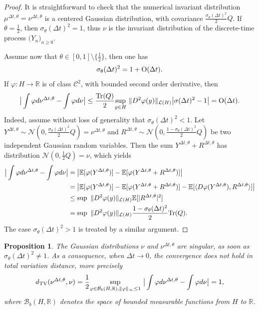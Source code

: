 \documentclass[11pt]{amsart}
\newcommand{\E}{\mathbb{E}}
\newcommand{\R}{\mathbb{R}}
\newtheorem{propo}[theo]{Proposition}
\begin{document}
\begin{proof}
 It is straightforward to check that the numerical invariant distribution $\mu^{\Delta t,\theta}=\nu^{\Delta t,\theta}$ is a centered Gaussian distribution, with covariance $\frac{\sigma_\theta(\Delta t)^2}{2}Q$.
If $\theta=\frac12$, then $\sigma_\theta(\Delta t)^2=1$, thus $\nu$ is the invariant distribution of the discrete-time process $\bigl(Y_n\bigr)_{n\ge 0}$.


Assume now that $\theta\in[0,1]\setminus\{\frac12\}$, then one has
\[
\sigma_\theta(\Delta t)^2=1+{\rm O}(\Delta t).
\]
If $\varphi:H\to\R$ is of class $\mathcal{C}^2$, with bounded second order derivative, then
\begin{equation}\label{eq:error_Gaussian_C2}
\big|\int \varphi d\nu^{\Delta t,\theta}-\int\varphi d\nu\big|\le \frac{{\rm Tr}(Q)}{2} \underset{y\in H}\sup~\|D^2\varphi(y)\|_{\mathcal{L}(H)}\big|\sigma(\Delta t)^2-1\big|={\rm O}(\Delta t).
\end{equation}
Indeed, assume without loss of generality that $\sigma_\theta(\Delta t)^2<1$. Let $Y^{\Delta t,\theta}\sim \mathcal{N}(0,\frac{\sigma_\theta(\Delta t)^2}{2}Q)=\nu^{\Delta t,\theta}$ and $R^{\Delta t,\theta}\sim \mathcal{N}(0,\frac{1-\sigma_\theta(\Delta t)^2}{2}Q)$ be two independent Gaussian random variables. Then the sum $Y^{\Delta t,\theta}+R^{\Delta t,\theta}$ has distribution $\mathcal{N}(0,\frac12 Q)=\nu$, which yields
\begin{align*}
\big|\int \varphi d\nu^{\Delta t,\theta}-\int\varphi d\nu\big|&=\big|\E[\varphi(Y^{\Delta t,\theta})]-\E[\varphi(Y^{\Delta t,\theta}+R^{\Delta t,\theta})]\big|\\
&=\big|\E[\varphi(Y^{\Delta t,\theta})]-\E[\varphi(Y^{\Delta t,\theta}+R^{\Delta t,\theta})]-\E[\langle D\varphi(Y^{\Delta t,\theta}),R^{\Delta t,\theta}\rangle]\big|\\
&\le \sup~\|D^2\varphi(y)\|_{\mathcal{L}(H)}\E[|R^{\Delta t,\theta}|^2]\\
&=\sup~\|D^2\varphi(y)\|_{\mathcal{L}(H)}\frac{1-\sigma_\theta(\Delta t)^2}{2}{\rm Tr}(Q).
\end{align*}
The case $\sigma_\theta(\Delta t)^2>1$ is treated by a similar argument.
\end{proof}


\begin{propo}
The Gaussian distributions $\nu$ and $\nu^{\Delta t,\theta}$ are singular, as soon as $\sigma_\theta(\Delta t)^2\neq 1$. As a consequence, when $\Delta t\to 0$, the convergence does not hold in total variation distance, more precisely
\begin{equation}\label{eq:error_Gaussian_TV}
d_{\rm TV}(\nu^{\Delta t,\theta},\nu)=\frac12\underset{\varphi\in \mathcal{B}_b(H,\R),\|\varphi\|_\infty\le 1}\sup~\big|\int \varphi d\nu^{\Delta t,\theta}-\int\varphi d\nu\big|=1,
\end{equation}
where $\mathcal{B}_b(H,\R)$ denotes the space of bounded measurable functions from $H$ to $\R$.
\end{propo}
\end{document}
